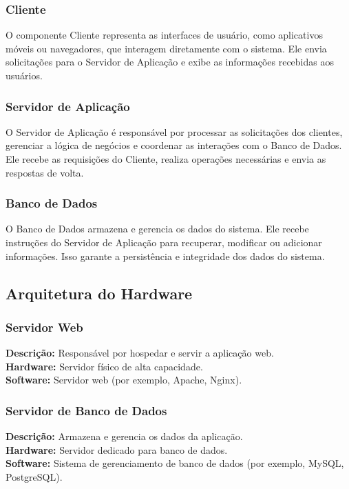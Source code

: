 \subsubsection{Cliente}

O componente Cliente representa as interfaces de usuário, como aplicativos móveis ou navegadores, que interagem diretamente com o sistema. Ele envia solicitações para o Servidor de Aplicação e exibe as informações recebidas aos usuários.

\subsubsection{Servidor de Aplicação}

 O Servidor de Aplicação é responsável por processar as solicitações dos clientes, gerenciar a lógica de negócios e coordenar as interações com o Banco de Dados. Ele recebe as requisições do Cliente, realiza operações necessárias e envia as respostas de volta.

\subsubsection{Banco de Dados}

O Banco de Dados armazena e gerencia os dados do sistema. Ele recebe instruções do Servidor de Aplicação para recuperar, modificar ou adicionar informações. Isso garante a persistência e integridade dos dados do sistema.


    \subsection{Arquitetura do Hardware}

\subsubsection{Servidor Web}

\textbf{Descrição:} Responsável por hospedar e servir a aplicação web. \\
\textbf{Hardware:} Servidor físico de alta capacidade. \\
\textbf{Software:} Servidor web (por exemplo, Apache, Nginx).

\subsubsection{Servidor de Banco de Dados}

\textbf{Descrição:} Armazena e gerencia os dados da aplicação. \\
\textbf{Hardware:} Servidor dedicado para banco de dados. \\
\textbf{Software:} Sistema de gerenciamento de banco de dados (por exemplo, MySQL, PostgreSQL).


